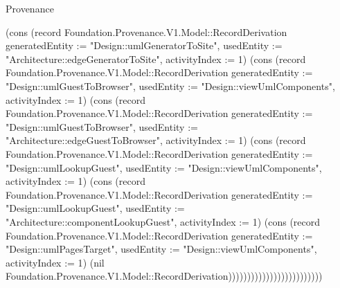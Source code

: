 \begin{lexlean}{Provenance}
\begin{semanticmodule}
{(cons (record Foundation.Provenance.V1.Model::RecordDerivation {generatedEntity := "Design::umlGeneratorToSite", usedEntity := "Architecture::edgeGeneratorToSite", activityIndex := 1}) (cons (record Foundation.Provenance.V1.Model::RecordDerivation {generatedEntity := "Design::umlGuestToBrowser", usedEntity := "Design::viewUmlComponents", activityIndex := 1}) (cons (record Foundation.Provenance.V1.Model::RecordDerivation {generatedEntity := "Design::umlGuestToBrowser", usedEntity := "Architecture::edgeGuestToBrowser", activityIndex := 1}) (cons (record Foundation.Provenance.V1.Model::RecordDerivation {generatedEntity := "Design::umlLookupGuest", usedEntity := "Design::viewUmlComponents", activityIndex := 1}) (cons (record Foundation.Provenance.V1.Model::RecordDerivation {generatedEntity := "Design::umlLookupGuest", usedEntity := "Architecture::componentLookupGuest", activityIndex := 1}) (cons (record Foundation.Provenance.V1.Model::RecordDerivation {generatedEntity := "Design::umlPagesTarget", usedEntity := "Design::viewUmlComponents", activityIndex := 1}) (nil Foundation.Provenance.V1.Model::RecordDerivation)))))))))))))))))))))))))
}


\end{semanticmodule}
\end{lexlean}
